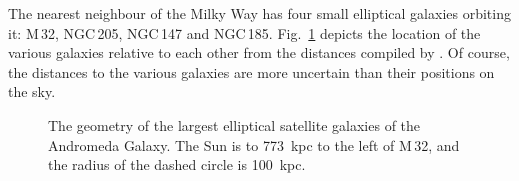 \documentclass[useAMS,usenatbib]{mn2e}
\begin{document}
The nearest neighbour of the Milky Way has four small elliptical
galaxies orbiting it: M\,32, NGC\,205, NGC\,147 and NGC\,185.
Fig.~\ref{fig:M31-system} depicts the location of the various galaxies
relative to each other from the distances compiled by
\citet{2006AJ....131.1405K}.  Of course, the distances to the various
galaxies are more uncertain than their positions on the sky.
\begin{figure}
  \begin{center}
  \end{center}
  \caption{The geometry of the largest elliptical satellite galaxies
    of the Andromeda Galaxy. The Sun is to 773~kpc to the left of
    M\,32, and the radius of the dashed circle is 100~kpc.}
  \label{fig:M31-system}
\end{figure}
\end{document}

